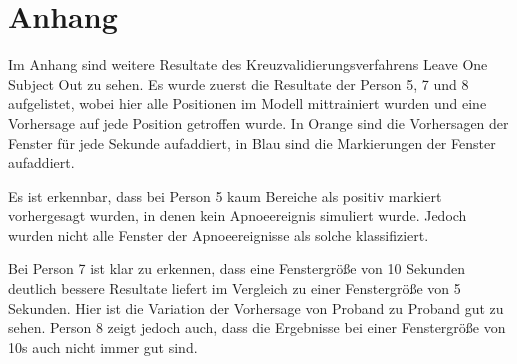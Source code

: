 \chapter{Anhang}
\label{ch:anhang}
Im Anhang sind weitere Resultate des Kreuzvalidierungsverfahrens {\glqq Leave One Subject Out\grqq} zu sehen.
Es wurde zuerst die Resultate der Person 5, 7 und 8 aufgelistet, wobei hier alle Positionen im Modell mittrainiert wurden und eine Vorhersage auf jede Position getroffen wurde.
In Orange sind die Vorhersagen der Fenster für jede Sekunde aufaddiert, in Blau sind die Markierungen der Fenster aufaddiert.

Es ist erkennbar, dass bei Person 5 kaum Bereiche als positiv markiert vorhergesagt wurden, in denen kein Apnoeereignis simuliert wurde.
Jedoch wurden nicht alle Fenster der Apnoeereignisse als solche klassifiziert.

Bei Person 7 ist klar zu erkennen, dass eine Fenstergröße von 10 Sekunden deutlich bessere Resultate liefert im Vergleich zu einer Fenstergröße von 5 Sekunden.
Hier ist die Variation der Vorhersage von Proband zu Proband gut zu sehen.
Person 8 zeigt jedoch auch, dass die Ergebnisse bei einer Fenstergröße von 10s auch nicht immer gut sind.

%

